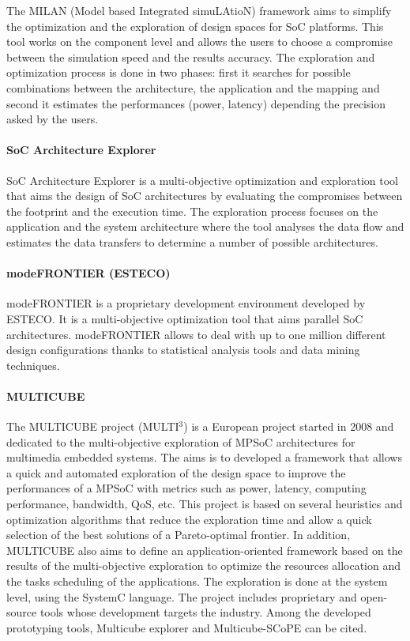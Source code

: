 The MILAN (Model based Integrated simuLAtioN) framework \cite{Mohanty02rapidsystem-level} aims to simplify the optimization and the exploration of design spaces for SoC platforms. This tool works on the component level and allows the users to choose a compromise between the simulation speed and the results accuracy. The exploration and optimization process is done in two phases: first it searches for possible combinations between the architecture, the application and the mapping and second it estimates the performances (power, latency) depending the precision asked by the users.

\paragraph{SoC Architecture Explorer}

SoC Architecture Explorer \cite{ueda05architecture} is a multi-objective optimization and exploration tool that aims the design of SoC architectures by evaluating the compromises between the footprint and the execution time. The exploration process focuses on the application and the system architecture where the tool analyses the data flow and estimates the data transfers to determine a number of possible architectures.

\paragraph{modeFRONTIER (ESTECO)}

modeFRONTIER \cite{esteco01} is a proprietary development environment developed by ESTECO. It is a multi-objective optimization tool that aims parallel SoC architectures. modeFRONTIER allows to deal with up to one million different design configurations thanks to statistical analysis tools and data mining techniques.

\paragraph{MULTICUBE}

The MULTICUBE project (MULTI$^{3}$) \cite{multicube08, Silvanoetal09} is a European project started in 2008 and dedicated to the multi-objective exploration of MPSoC architectures for multimedia embedded systems. The aims is to developed a framework that allows a quick and automated exploration of the design space to improve the performances of a MPSoC with metrics such as power, latency, computing performance, bandwidth, QoS, etc. This project is based on several heuristics and optimization algorithms that reduce the exploration time and allow a quick selection of the best solutions of a Pareto-optimal frontier. In addition, MULTICUBE also aims to define an application-oriented framework based on the results of the multi-objective exploration to optimize the resources allocation and the tasks scheduling of the applications. The exploration is done at the system level, using the SystemC language. The project includes proprietary and open-source tools whose development targets the industry. Among the developed prototyping tools, Multicube explorer and Multicube-SCoPE can be cited.

